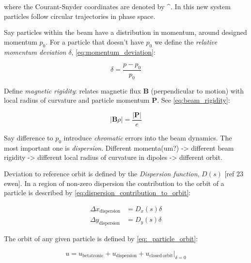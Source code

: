 where the Courant-Snyder coordinates are denoted by \^{}.
In this new system particles follow circular trajectories in phase space.
\bigbreak

Say particles within the beam have a distribution in momentum, around designed momentum $p_0$.
For a particle that doesn't have $p_0$ we define the \textit{relative momentum deviation} $\delta$, \cref{eq:momentum_deviation}:
\bigbreak

\begin{equation}
    \delta = \frac{p - p_0}{p_0}
    \label{eq:momentum_deviation}
\end{equation}
\bigbreak

Define \textit{magnetic rigidity}: relates magnetic flux $\mathbf{B}$ (perpendicular to motion) with local radius of curvature and particle momentum $\mathbf{P}$.
See \cref{eq:beam_rigidity}:
\bigbreak

\begin{equation}
    \lvert \mathbf{B} \rho \rvert = \frac{\lvert \mathbf{P} \lvert}{e}
    \label{eq:beam_rigidity}
\end{equation}
\bigbreak

Say difference to $p_0$ introduce \emph{chromatic} errors into the beam dynamics.
The most important one is \emph{dispersion}.
Different momenta(um?) -> different beam rigidity -> different local radius of curvature in dipoles -> different orbit.

Deviation to reference orbit is defined by the \emph{Dispersion function}, $D(s)$ [ref 23 ewen].
In a region of non-zero dispersion the contribution to the orbit of a particle is described by \cref{eq:dispersion_contribution_to_orbit}:
\bigbreak

\begin{equation}
    \begin{aligned}
    \Delta x_{\mathrm{dispersion}} &= D_{x}(s) \delta \\
    \Delta y_{\mathrm{dispersion}} &= D_{y}(s) \delta
    \end{aligned}
    \label{eq:dispersion_contribution_to_orbit}
\end{equation}
\bigbreak

The orbit of any given particle is defined by \cref{eq:_particle_orbit}:
\bigbreak

\begin{equation}
    u = u_{\mathrm{betatronic}} + u_{\mathrm{dispersion}} + \left.u_{\mathrm{closed \ orbit}} \right\rvert_{\delta = 0}
    \label{eq:_particle_orbit}
\end{equation}

